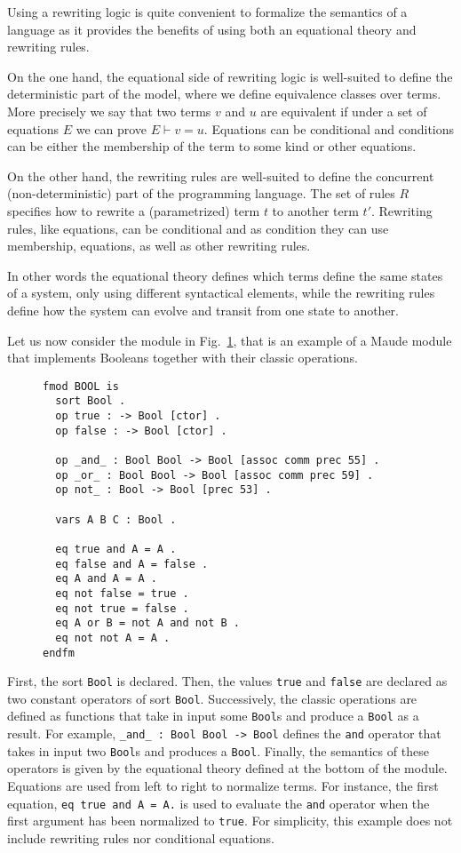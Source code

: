 \documentclass{article}[12pt,a4paper]
\theoremstyle{definition}
\begin{document}
Using a rewriting logic is quite convenient to formalize the
semantics of a language as it provides the benefits of using both an equational theory and rewriting rules.

On the one hand, the equational side of rewriting logic is well-suited to define the deterministic part of the model, where
we define equivalence classes over terms. More precisely we say that two terms
$v$ and $u$ are equivalent if under a set of equations $E$ we can prove $E \vdash
v = u$. Equations can be conditional and conditions can be either the
membership of the term to some kind or other equations.

On the other hand, the rewriting rules are well-suited to define the concurrent
(non-deterministic) part of the programming language. The set of rules $R$
specifies how to rewrite a (parametrized) term $t$ to another term $t'$.
Rewriting rules, like equations, can be conditional and as condition they can
use membership, equations, as well as other rewriting rules.

In other words the equational theory defines which terms define the same states
of a system, only using different syntactical elements, while the rewriting rules
define how the system can evolve and transit from one state to another.

Let us now consider the module in Fig.~\ref{fig:bool}, that is an example of a Maude module that implements Booleans together with their classic operations.

\begin{figure}[t]
\begin{verbatim}
fmod BOOL is
  sort Bool .
  op true : -> Bool [ctor] .
  op false : -> Bool [ctor] .

  op _and_ : Bool Bool -> Bool [assoc comm prec 55] .
  op _or_ : Bool Bool -> Bool [assoc comm prec 59] .
  op not_ : Bool -> Bool [prec 53] .

  vars A B C : Bool .

  eq true and A = A .
  eq false and A = false .
  eq A and A = A .
  eq not false = true .
  eq not true = false .
  eq A or B = not A and not B .
  eq not not A = A .
endfm
\end{verbatim}
  \label{fig:bool}
\end{figure}

First, the sort \verb+Bool+ is declared. Then, the values \verb+true+ and \verb+false+ are declared
as two constant operators of sort \verb+Bool+. Successively, the classic operations are
defined as functions that take in input some \verb+Bool+s and produce a \verb+Bool+ as a
result. For example, \verb+_and_ : Bool Bool -> Bool+ defines the \verb+and+
operator that takes in input two \verb+Bool+s and produces a \verb+Bool+. Finally, the semantics of these operators is given
by the equational theory defined at the bottom of the module. Equations are used
from left to right to normalize terms. For instance, the first equation,
\verb+eq true and A = A.+ is used to evaluate the \verb+and+ operator when the first
argument has been normalized to \verb+true+. For simplicity, this example does not include rewriting rules nor conditional equations.
\end{document}
